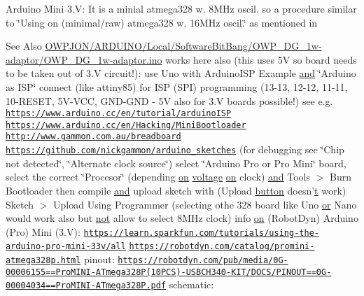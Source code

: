 Arduino Mini 3.\-V\-: It is a minial atmega328 w. 8\-M\-Hz oscil. so a procedure similar to \char`\"{}\-Using on (minimal/raw) atmega328 w. 16\-M\-Hz oscil.\char`\"{} as mentioned in \begin{DoxySeeAlso}{See Also}
\hyperlink{OWP__DG__1w-adaptor_8ino}{O\-W\-P\-J\-O\-N/\-A\-R\-D\-U\-I\-N\-O/\-Local/\-Software\-Bit\-Bang/\-O\-W\-P\-\_\-\-D\-G\-\_\-1w-\/adaptor/\-O\-W\-P\-\_\-\-D\-G\-\_\-1w-\/adaptor.\-ino} works here also (this uses 5\-V so board needs to be taken out of 3.\-V circuit!)\-: use Uno with Arduino\-I\-S\-P Example \hyperlink{iso646_8h_aa3d7d535cf450b91b9cb6d9cee2edbb9}{and} \char`\"{}\-Arduino as I\-S\-P\char`\"{} connect (like attiny85) for I\-S\-P (S\-P\-I) programming (13-\/13, 12-\/12, 11-\/11, 10-\/\-R\-E\-S\-E\-T, 5\-V-\/\-V\-C\-C, G\-N\-D-\/\-G\-N\-D -\/ 5\-V also for 3.\-V boards possible!) see e.\-g. \href{https://www.arduino.cc/en/tutorial/arduinoISP}{\tt https\-://www.\-arduino.\-cc/en/tutorial/arduino\-I\-S\-P} \href{https://www.arduino.cc/en/Hacking/MiniBootloader}{\tt https\-://www.\-arduino.\-cc/en/\-Hacking/\-Mini\-Bootloader} \href{http://www.gammon.com.au/breadboard}{\tt http\-://www.\-gammon.\-com.\-au/breadboard} \href{https://github.com/nickgammon/arduino_sketches}{\tt https\-://github.\-com/nickgammon/arduino\-\_\-sketches} (for debugging see \char`\"{}\-Chip not detected\char`\"{}, \char`\"{}\-Alternate clock source\char`\"{}) select \char`\"{}\-Arduino Pro or Pro Mini\char`\"{} board, select the correct \char`\"{}\-Procesor\char`\"{} (depending \hyperlink{term_8js_ac6ebb2e1fddfd9205cff6790e2aaa3a6}{on} \hyperlink{Uno__Read__HumidityCapacitor__KFS140-D_8ino_a003bbb537dac1547ff44bac4bf180a73}{voltage} \hyperlink{term_8js_ac6ebb2e1fddfd9205cff6790e2aaa3a6}{on} clock) \hyperlink{iso646_8h_aa3d7d535cf450b91b9cb6d9cee2edbb9}{and} Tools $>$ Burn Bootloader then compile \hyperlink{iso646_8h_aa3d7d535cf450b91b9cb6d9cee2edbb9}{and} upload sketch with (Upload \hyperlink{Uno__N64__Controller__Pak__Reader_8ino_a0a7e6169ae96e651da0b37fae3034554}{button} doesn'\hyperlink{Yun__Log__BatteryDisCharging_8ino_a1ffe6f4d89de83b8119fa91af85fcacc}{t} work) Sketch $>$ Upload Using Programmer (selecting othe 328 board like Uno \hyperlink{iso646_8h_a339a611d7f9dc3a59c359f0da7beaf3c}{or} Nano would work also but \hyperlink{iso646_8h_a31739c27bdcfdac9faae7bf7a5df49e4}{not} allow to select 8\-M\-Hz clock) info \hyperlink{term_8js_ac6ebb2e1fddfd9205cff6790e2aaa3a6}{on} (Robot\-Dyn) Arduino (Pro) Mini (3.\-V)\-: \href{https://learn.sparkfun.com/tutorials/using-the-arduino-pro-mini-33v/all}{\tt https\-://learn.\-sparkfun.\-com/tutorials/using-\/the-\/arduino-\/pro-\/mini-\/33v/all} \href{https://robotdyn.com/catalog/promini-atmega328p.html}{\tt https\-://robotdyn.\-com/catalog/promini-\/atmega328p.\-html} pinout\-: \href{https://robotdyn.com/pub/media/0G-00006155==ProMINI-ATmega328P(10PCS)-USBCH340-KIT/DOCS/PINOUT==0G-00004034==ProMINI-ATmega328P.pdf}{\tt https\-://robotdyn.\-com/pub/media/0\-G-\/00006155==\-Pro\-M\-I\-N\-I-\/\-A\-Tmega328\-P(10\-P\-C\-S)-\/\-U\-S\-B\-C\-H340-\/\-K\-I\-T/\-D\-O\-C\-S/\-P\-I\-N\-O\-U\-T==0\-G-\/00004034==\-Pro\-M\-I\-N\-I-\/\-A\-Tmega328\-P.\-pdf} schematic\-: 
\end{DoxySeeAlso}
